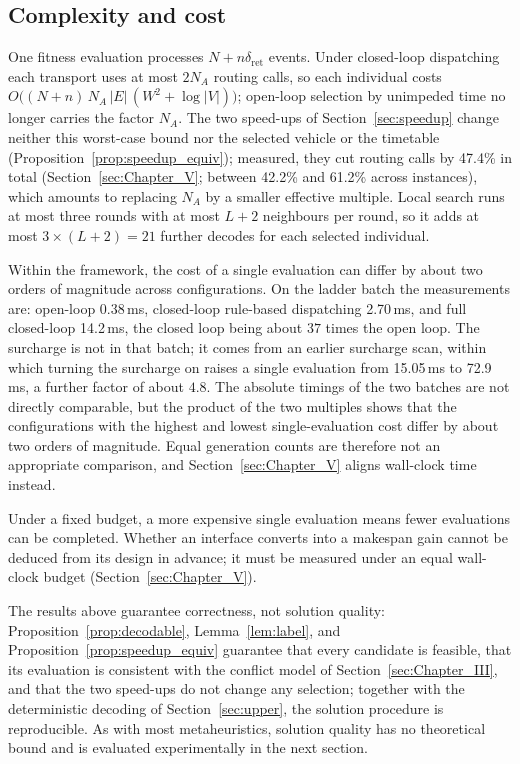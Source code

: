 \documentclass[manuscript,screen,review]{acmart}
\newcommand{\RouteCallCutLo}{42.2\%}     %
\newcommand{\RouteCallCutHi}{61.2\%}     %
\newcommand{\RouteCallCut}{47.4\%}
\newcommand{\MsOpen}{0.38}
\newcommand{\MsLoopRule}{2.70}
\newcommand{\MsLoopProbe}{14.2}
\newcommand{\MsPriced}{72.9}
\newcommand{\MsPricedRef}{15.05}         %
\begin{document}
\subsection{Complexity and cost}

One fitness evaluation processes $N+n\delta_{\mathrm{ret}}$ events. Under closed-loop dispatching each transport uses at most $2N_A$ routing calls, so each individual costs
$O\bigl((N+n)\,N_A\,|E|\,(W^{2}+\log|V|)\bigr)$; open-loop selection by unimpeded time no longer carries the factor $N_A$.
The two speed-ups of Section~\ref{sec:speedup} change neither this worst-case bound nor the selected vehicle or the timetable (Proposition~\ref{prop:speedup_equiv}); measured, they cut routing calls by \RouteCallCut{} in total (Section~\ref{sec:Chapter_V}; between \RouteCallCutLo{} and \RouteCallCutHi{} across instances), which amounts to replacing $N_A$ by a smaller effective multiple.
Local search runs at most three rounds with at most $L+2$ neighbours per round, so it adds at most $3\times(L+2)=21$ further decodes for each selected individual.

Within the framework, the cost of a single evaluation can differ by about two orders of magnitude across configurations. On the ladder batch the measurements are: open-loop \MsOpen{}\,ms, closed-loop rule-based dispatching \MsLoopRule{}\,ms, and full closed-loop \MsLoopProbe{}\,ms, the closed loop being about $37$ times the open loop.
The surcharge is not in that batch; it comes from an earlier surcharge scan, within which turning the surcharge on raises a single evaluation from \MsPricedRef{}\,ms to \MsPriced{}\,ms, a further factor of about $4.8$.
The absolute timings of the two batches are not directly comparable, but the product of the two multiples shows that the configurations with the highest and lowest single-evaluation cost differ by about two orders of magnitude.
Equal generation counts are therefore not an appropriate comparison, and Section~\ref{sec:Chapter_V} aligns wall-clock time instead.

Under a fixed budget, a more expensive single evaluation means fewer evaluations can be completed. Whether an interface converts into a makespan gain cannot be deduced from its design in advance; it must be measured under an equal wall-clock budget (Section~\ref{sec:Chapter_V}).

The results above guarantee correctness, not solution quality: Proposition~\ref{prop:decodable}, Lemma~\ref{lem:label}, and Proposition~\ref{prop:speedup_equiv} guarantee that every candidate is feasible, that its evaluation is consistent with the conflict model of Section~\ref{sec:Chapter_III}, and that the two speed-ups do not change any selection; together with the deterministic decoding of Section~\ref{sec:upper}, the solution procedure is reproducible.
As with most metaheuristics, solution quality has no theoretical bound and is evaluated experimentally in the next section.
\end{document}
